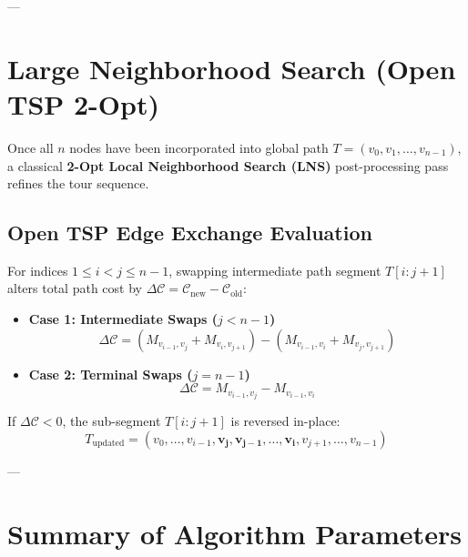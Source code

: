 \documentclass[11pt,a4paper]{article}
\begin{document}
---

\section{Large Neighborhood Search (Open TSP 2-Opt)}

Once all $n$ nodes have been incorporated into global path $T = (v_0, v_1, \dots, v_{n-1})$, a classical \textbf{2-Opt Local Neighborhood Search (LNS)} post-processing pass refines the tour sequence.

\subsection{Open TSP Edge Exchange Evaluation}
For indices $1 \le i < j \le n - 1$, swapping intermediate path segment $T[i : j+1]$ alters total path cost by $\Delta \mathcal{C} = \mathcal{C}_{\text{new}} - \mathcal{C}_{\text{old}}$:

\begin{itemize}
    \item \textbf{Case 1: Intermediate Swaps ($j < n - 1$)}
    \begin{equation}
    \Delta \mathcal{C} = \left( M_{v_{i-1}, v_j} + M_{v_i, v_{j+1}} \right) - \left( M_{v_{i-1}, v_i} + M_{v_j, v_{j+1}} \right)
    \end{equation}

    \item \textbf{Case 2: Terminal Swaps ($j = n - 1$)}
    \begin{equation}
    \Delta \mathcal{C} = M_{v_{i-1}, v_j} - M_{v_{i-1}, v_i}
    \end{equation}
\end{itemize}

If $\Delta \mathcal{C} < 0$, the sub-segment $T[i : j+1]$ is reversed in-place:
\begin{equation}
T_{\text{updated}} = (v_0, \dots, v_{i-1}, \mathbf{v_j, v_{j-1}, \dots, v_i}, v_{j+1}, \dots, v_{n-1})
\end{equation}

---

\section{Summary of Algorithm Parameters}
\end{document}
